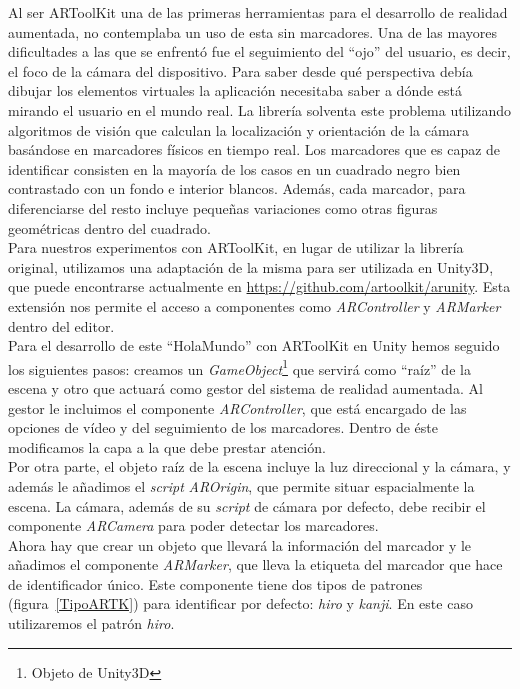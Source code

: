 Al ser ARToolKit una de las primeras herramientas para el desarrollo de realidad aumentada, no contemplaba un uso de esta sin marcadores. Una de las mayores dificultades a las que se enfrentó fue el seguimiento del “ojo” del usuario, es decir, el foco de la cámara del dispositivo. Para saber desde qué perspectiva debía dibujar los elementos virtuales la aplicación necesitaba saber a dónde está mirando el usuario en el mundo real. La librería solventa este problema utilizando algoritmos de visión que calculan la localización y orientación de la cámara basándose en marcadores físicos en tiempo real.
Los marcadores que es capaz de identificar consisten en la mayoría de los casos en un cuadrado negro bien contrastado con un fondo e interior blancos. Además, cada marcador, para diferenciarse del resto incluye pequeñas variaciones como otras figuras geométricas dentro del cuadrado.\\

Para nuestros experimentos con ARToolKit, en lugar de utilizar la librería original, utilizamos una adaptación de la misma para ser utilizada en Unity3D, que puede encontrarse actualmente en \url{https://github.com/artoolkit/arunity}. Esta extensión nos permite el acceso a componentes como \textit{ARController} y \textit{ARMarker} dentro del editor.\\

Para el desarrollo de este “HolaMundo” con ARToolKit en Unity hemos seguido los siguientes pasos: creamos un \textit{GameObject}\footnote{Objeto de Unity3D}  que servirá como “raíz” de la escena y otro que actuará como gestor del sistema de realidad aumentada. Al gestor le incluimos el componente \textit{ARController}, que está encargado de las opciones de vídeo y del seguimiento de los marcadores. Dentro de éste modificamos la capa a la que debe prestar atención. \\

Por otra parte, el objeto raíz de la escena incluye la luz direccional y la cámara, y además le añadimos el \textit{script} \textit{AROrigin}, que permite situar espacialmente la escena. La cámara, además de su \textit{script} de cámara por defecto, debe recibir el componente \textit{ARCamera} para poder detectar los marcadores.\\

Ahora hay que crear un objeto que llevará la información del marcador y le añadimos el componente \textit{ARMarker}, que lleva la etiqueta del marcador que hace de identificador único. Este componente tiene dos tipos de patrones (figura~\ref{TipoARTK}) para identificar por defecto: \textit{hiro} y \textit{kanji}. En este caso utilizaremos el patrón \textit{hiro}.\\

